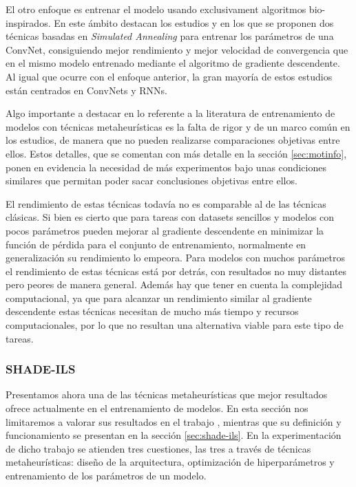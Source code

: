 El otro enfoque es entrenar el modelo usando exclusivament algoritmos bio-inspirados. En este ámbito destacan los estudios \cite{174} y \cite{176} en los que se proponen dos técnicas basadas en \textit{Simulated Annealing} \cite{siman} para entrenar los parámetros de una ConvNet, consiguiendo mejor rendimiento y mejor velocidad de convergencia que en el mismo modelo entrenado mediante el algoritmo de gradiente descendente. Al igual que ocurre con el enfoque anterior, la gran mayoría de estos estudios están centrados en ConvNets y RNNs. 

Algo importante a destacar en lo referente a la literatura de entrenamiento de modelos con técnicas metaheurísticas es la falta de rigor y de un marco común en los estudios, de manera que no pueden realizarse comparaciones objetivas entre ellos. Estos detalles, que se comentan con más detalle en la sección \ref{sec:motinfo}, ponen en evidencia la necesidad de más experimentos bajo unas condiciones similares que permitan poder sacar conclusiones objetivas entre ellos.

El rendimiento de estas técnicas todavía no es comparable al de las técnicas clásicas. Si bien es cierto que para tareas con datasets sencillos y modelos con pocos parámetros pueden mejorar al gradiente descendente en minimizar la función de pérdida para el conjunto de entrenamiento, normalmente en generalización su rendimiento lo empeora. Para modelos con muchos parámetros el rendimiento de estas técnicas está por detrás, con resultados no muy distantes pero peores de manera general. Además hay que tener en cuenta la complejidad computacional, ya que para alcanzar un rendimiento similar al gradiente descendente estas técnicas necesitan de mucho más tiempo y recursos computacionales, por lo que no resultan una alternativa viable para este tipo de tareas.




\subsubsection{SHADE-ILS}

Presentamos ahora una de las técnicas metaheurísticas que mejor resultados ofrece actualmente en el entrenamiento de modelos. En esta sección nos limitaremos a valorar sus resultados en el trabajo \cite{MHtrainingClase}, mientras que su definición y funcionamiento se presentan en la sección \ref{sec:shade-ils}. En la experimentación de dicho trabajo se atienden tres cuestiones, las tres a través de técnicas metaheurísticas: diseño de la arquitectura, optimización de hiperparámetros y entrenamiento de los parámetros de un modelo. 


